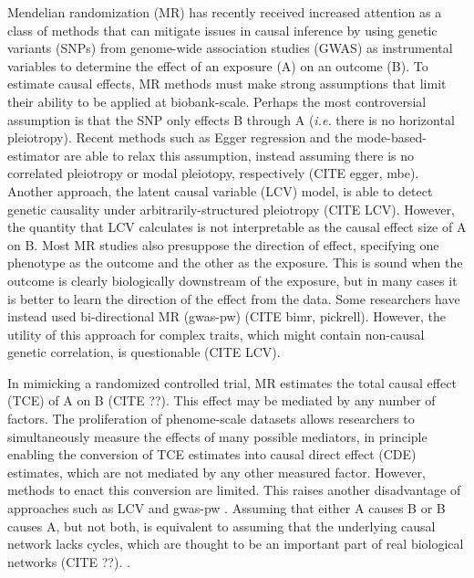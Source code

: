 \documentclass{article}
\begin{document}
Mendelian randomization (MR) has recently received increased attention as a class of methods
that can mitigate issues in causal inference
 by using genetic variants (SNPs) from genome-wide
association studies (GWAS) as instrumental variables to determine the effect
of an exposure (A) on an outcome (B). To estimate causal effects,
MR methods must make strong assumptions that limit their
ability to be applied at biobank-scale. Perhaps the most
controversial assumption is that the SNP only effects B through A
(\textit{i.e.} there is no horizontal pleiotropy). Recent methods such as Egger
regression and the mode-based-estimator are able to relax this assumption, instead
assuming there is no correlated pleiotropy or modal pleiotopy, respectively (CITE egger, mbe).
Another approach, the latent causal variable (LCV) model, is able to detect genetic causality 
under arbitrarily-structured pleiotropy (CITE LCV). However, the quantity that LCV
calculates is not interpretable as the causal effect size of A on B. Most MR studies
also presuppose the direction of effect, specifying one phenotype as the outcome and
the other as the exposure. This is sound when the outcome
is clearly biologically downstream of the exposure, but in many cases it is better
to learn the direction of the effect from the data. 
Some researchers have instead used bi-directional MR (gwas-pw) (CITE bimr, pickrell).
However, the utility of this approach for complex traits,
which might contain non-causal genetic correlation,
is questionable (CITE LCV).

In mimicking a randomized controlled trial, MR estimates the
total causal effect (TCE) of A on B (CITE ??). This effect may be mediated by
any number of factors. The proliferation of phenome-scale datasets
allows researchers to simultaneously measure the effects of many possible mediators,
in principle enabling the conversion of TCE estimates into causal direct effect (CDE) 
estimates, which are not mediated by any other measured factor.
However, methods to enact this conversion are limited. 
This raises another disadvantage of approaches such as LCV and gwas-pw . Assuming that either
A causes B or B causes A, but not both, is equivalent to assuming
that the underlying causal network
lacks cycles, which are thought to be an important part of real biological networks (CITE ??). .  
\end{document}
